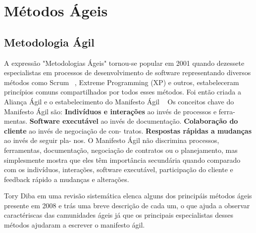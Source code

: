 \chapter{Métodos Ágeis}
\label{cap-metodos-ageis}

\section{Metodologia Ágil}
\label{metodologia-agil}

A expressão "Metodologias Ágeis" tornou-se popular em 2001 quando dezessete especialistas em processos de desenvolvimento de software representando diversos métodos como Scrum ~\cite{}, %
Extreme Programming (XP) e outros, estabeleceram princípios comuns compartilhados por todos esses métodos. Foi então criada a Aliança Ágil e o estabelecimento do Manifesto Ágil ~\cite{} %
Os conceitos chave do Manifesto Ágil são:
\textbf{Indivíduos e interações} ao invés de processos e ferra-
mentas.
\textbf{Software executável} ao invés de documentação.
\textbf{Colaboração do cliente} ao invés de negociação de con-
tratos.
\textbf{Respostas rápidas a mudanças} ao invés de seguir pla-
nos.
O Manifesto Ágil não discrimina processos, ferramentas, documentação, negociação de contratos ou o planejamento, mas simplesmente mostra que eles têm importância secundária quando comparado com os indivíduos, interações, software executável, participação do cliente e feedback rápido a mudanças e alterações.

Tory Diba em uma revisão sistemática elenca alguns dos principáis métodos ágeis presente em 2008 e trás uma breve descrição de cada um, o que ajuda a observar caractériscas das camunidades ágeis já que os principais especialistas desses métodos ajudaram a escrever o manifesto ágil.\cite{}%

